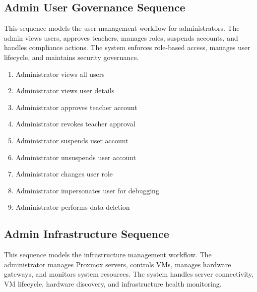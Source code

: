 
\subsection{Admin User Governance Sequence}
This sequence models the user management workflow for administrators. The admin
views users, approves teachers, manages roles, suspends accounts, and handles
compliance actions. The system enforces role-based access, manages user
lifecycle, and maintains security governance.

\begin{enumerate}[topsep=0pt,itemsep=1pt,parsep=0pt,partopsep=0pt]
    \item Administrator views all users
    \item Administrator views user details
    \item Administrator approves teacher account
    \item Administrator revokes teacher approval
    \item Administrator suspends user account
    \item Administrator unsuspends user account
    \item Administrator changes user role
    \item Administrator impersonates user for debugging
    \item Administrator performs data deletion
\end{enumerate}


\subsection{Admin Infrastructure Sequence}
This sequence models the infrastructure management workflow. The administrator
manages Proxmox servers, controls VMs, manages hardware gateways, and monitors
system resources. The system handles server connectivity, VM lifecycle,
hardware discovery, and infrastructure health monitoring.

